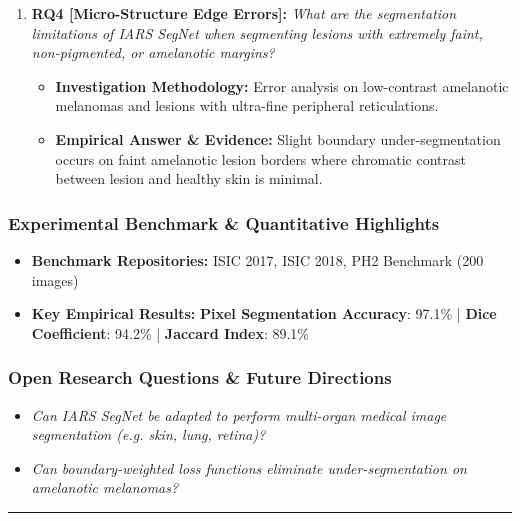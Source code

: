 \begin{enumerate}[label=\textbf{\arabic*.}, leftmargin=*]
\begin{itemize}[leftmargin=1.5em]
    \item \textbf{Empirical Answer \& Evidence:} Demonstrated exceptional consistency across datasets, outperforming standard U-Net, baseline SegNet, and DeepLabV3+ in boundary precision and Dice score.
  \end{itemize}
  \item \textbf{RQ4 [Micro-Structure Edge Errors]:} \textit{What are the segmentation limitations of IARS SegNet when segmenting lesions with extremely faint, non-pigmented, or amelanotic margins?}
  \begin{itemize}[leftmargin=1.5em]
    \item \textbf{Investigation Methodology:} Error analysis on low-contrast amelanotic melanomas and lesions with ultra-fine peripheral reticulations.
    \item \textbf{Empirical Answer \& Evidence:} Slight boundary under-segmentation occurs on faint amelanotic lesion borders where chromatic contrast between lesion and healthy skin is minimal.
  \end{itemize}
\end{enumerate}

\subsubsection*{Experimental Benchmark \& Quantitative Highlights}
\begin{itemize}[leftmargin=*]
  \item \textbf{Benchmark Repositories:} ISIC 2017, ISIC 2018, PH2 Benchmark (200 images)
  \item \textbf{Key Empirical Results:} \textbf{Pixel Segmentation Accuracy}: 97.1\% \quad | \quad \textbf{Dice Coefficient}: 94.2\% \quad | \quad \textbf{Jaccard Index}: 89.1\%
\end{itemize}

\subsubsection*{Open Research Questions \& Future Directions}
\begin{itemize}[leftmargin=*]
  \item \textit{Can IARS SegNet be adapted to perform multi-organ medical image segmentation (e.g. skin, lung, retina)?}
  \item \textit{Can boundary-weighted loss functions eliminate under-segmentation on amelanotic melanomas?}
\end{itemize}
\vspace{0.8em}\hrule\vspace{1.2em}
